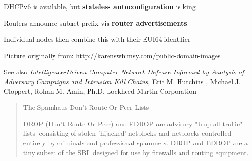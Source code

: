 \documentclass[Screen16to9,17pt]{foils}
\begin{document}


\begin{list1}
\item DHCPv6 is available, but {\bfseries stateless autoconfiguration} is king
\item Routers announce subnet prefix via {\bfseries router advertisements}
\item Individual nodes then combine this with their EUI64 identifier
\end{list1}







\centerline{Picture originally from: \url{http://karenswhimsy.com/public-domain-images}}




\begin{list2}
\item See also \emph{Intelligence-Driven Computer Network Defense Informed by Analysis of Adversary Campaigns and Intrusion Kill Chains}, Eric M. Hutchins , Michael J. Cloppert, Rohan M. Amin, Ph.D. Lockheed Martin Corporation\\{\footnotesize
 }
\end{list2}



\begin{quote}
The Spamhaus Don't Route Or Peer Lists

DROP (Don't Route Or Peer) and EDROP are advisory "drop all traffic" lists, consisting of stolen 'hijacked' netblocks and netblocks controlled entirely by criminals and professional spammers. DROP and EDROP are a tiny subset of the SBL designed for use by firewalls and routing equipment.
\end{quote}
\end{document}
